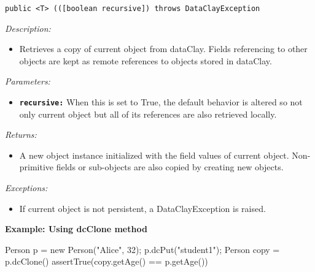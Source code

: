 
\begin{dBox}
\texttt{public <T>  (([boolean recursive]) throws DataClayException}
\LINE

{\it Description:}

\begin{itemize}
    \item Retrieves a copy of current object from dataClay. Fields referencing to other objects are kept as remote references to objects stored in dataClay.
\end{itemize}

{\it Parameters:}
\begin{itemize}
    \item \texttt{\bfseries recursive:} When this is set to True, the default behavior is altered so not only current object but all of its references are also retrieved locally.
\end{itemize}

{\it Returns:}

\begin{itemize}
    \item A new object instance initialized with the field values of current object. Non-primitive fields or sub-objects are also copied by creating new objects.
\end{itemize}

{\it Exceptions:}

\begin{itemize}
    \item If current object is not persistent, a DataClayException is raised.
\end{itemize}

\end{dBox}

\begin{tBox}
\textcolor{basecolor} {\bf Example: Using dcClone method}
\begin{java}
Person p = new Person("Alice", 32);
p.dcPut("student1");
Person copy = p.dcClone()
assertTrue(copy.getAge() == p.getAge())
\end{java}
\end{tBox}



